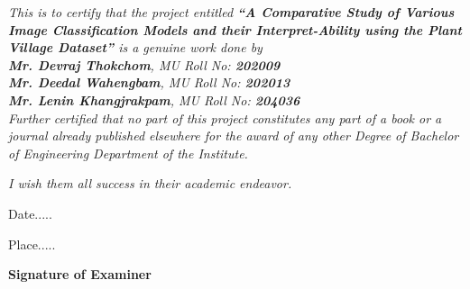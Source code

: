 \documentclass[12pt, oneside, a4paper]{book}
\begin{document}
\begingroup
    \begin{onehalfspace}
  \color{black}
  \textit{This is to certify that the project entitled \textbf{``A Comparative Study of Various Image Classification Models and their Interpret-Ability using the Plant Village Dataset''} is a genuine work done by}\\[1em]
    \textit{\hspace*{4em}\textbf{Mr. Devraj Thokchom}, MU Roll No: \textbf{202009}\\
    \hspace*{4em}\textbf{Mr. Deedal Wahengbam}, MU Roll No: \textbf{202013}\\
    \hspace*{4em}\textbf{Mr. Lenin Khangjrakpam}, MU Roll No: \textbf{204036}}\\[1em]

    \textit{Further certified that no part of this project constitutes any part of a book or a journal already published elsewhere for the award of any other Degree of Bachelor of Engineering Department of the Institute.}\par
    \textit{I wish them all success in their academic endeavor.}\par
    \end{onehalfspace}
\endgroup

\vspace{7em}

\begingroup
    \begin{minipage}[c]{.5\textwidth}
    \RaggedRight
    \large Date.....  \par
    \large Place.....  \par
    \end{minipage}%
    \begin{minipage}[c]{.5\textwidth}
    \RaggedRight
    \normalsize \textbf{Signature of Examiner}\\
    \end{minipage}    
\endgroup
\end{document}
